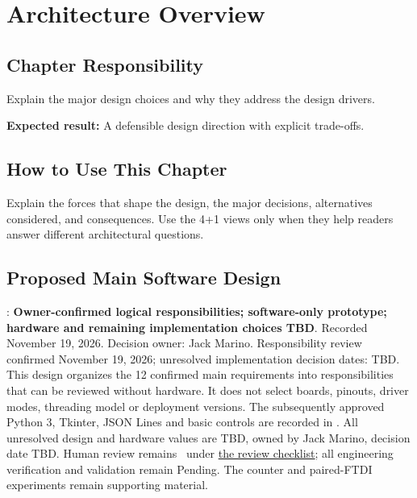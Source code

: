 \chapter{Architecture Overview}
\section{Chapter Responsibility}
\label{Section:ArchitectureOverviewResponsibility}
Explain the major design choices and why they address the design drivers.

\noindent\textbf{Expected result:} A defensible design direction with explicit trade-offs.

\section{How to Use This Chapter}
Explain the forces that shape the design, the major decisions, alternatives considered, and consequences. Use the 4+1 views only when they help readers answer different architectural questions.
\section{Proposed Main Software Design}
\label{Section:MainSoftwareDesign}
: \textbf{Owner-confirmed logical responsibilities; software-only prototype; hardware and remaining implementation choices TBD}.
Recorded November 19, 2026. Decision owner: Jack Marino. Responsibility review confirmed November 19, 2026; unresolved implementation decision dates: TBD.
This design organizes the 12 confirmed main requirements into responsibilities
that can be reviewed without hardware. It does not select boards, pinouts,
driver modes, threading model or deployment versions. The subsequently approved Python 3, Tkinter, JSON Lines and basic controls are recorded in . All unresolved design and hardware values
are TBD, owned by Jack Marino, decision date TBD. Human review remains
\StatusPending\ under \hyperref[Section:HumanReviewChecklist]{the review checklist};
all engineering verification and validation remain Pending.
The counter and paired-FTDI experiments remain supporting material.

